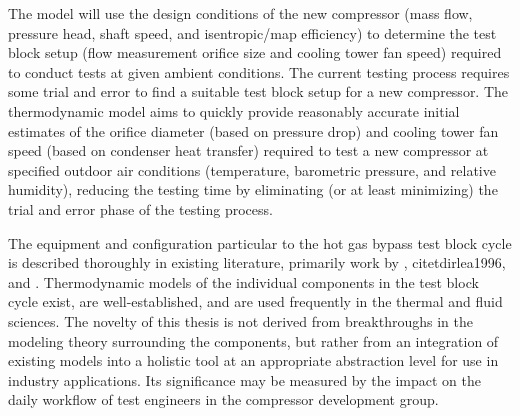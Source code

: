 The model will use the design conditions of the new compressor 
(mass flow, pressure head, shaft speed, and isentropic/map efficiency) 
to determine the test block setup 
(flow measurement orifice size and cooling tower fan speed) 
required to conduct tests at given ambient conditions. 
The current testing process requires some trial and error 
to find a suitable test block setup for a new compressor. 
The thermodynamic model aims to quickly provide reasonably accurate 
initial estimates of the orifice diameter (based on pressure drop) 
and cooling tower fan speed (based on condenser heat transfer) 
required to test a new compressor at specified outdoor air conditions
(temperature, barometric pressure, and relative humidity), 
reducing the testing time by eliminating (or at least minimizing) 
the trial and error phase of the testing process.

The equipment and configuration particular to the hot gas bypass test block
cycle is described thoroughly in existing literature, primarily work by
\citet{mcgovern1984}, citet{dirlea1996}, and \citet{sahs1956}.
Thermodynamic models of the individual components in the test block cycle exist, 
are well-established, and are used frequently in the thermal and fluid sciences.
The novelty of this thesis is not derived from breakthroughs in the modeling theory
surrounding the components, but rather from an integration of existing models
into a holistic tool at an appropriate abstraction level 
for use in industry applications.
Its significance may be measured by the impact on the daily workflow
of test engineers in the compressor development group.

